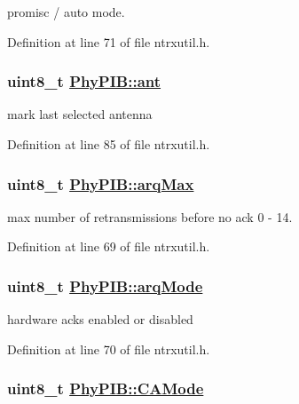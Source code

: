 promisc / auto mode. 

Definition at line 71 of file ntrxutil.h.\hypertarget{structPhyPIB_90a4fd3a47774b102b093feac7c72abc}{
\subsubsection[ant]{\setlength{\rightskip}{0pt plus 5cm}uint8\_\-t \hyperlink{structPhyPIB_90a4fd3a47774b102b093feac7c72abc}{Phy\-PIB::ant}}}
\label{structPhyPIB_90a4fd3a47774b102b093feac7c72abc}


mark last selected antenna 

Definition at line 85 of file ntrxutil.h.\hypertarget{structPhyPIB_3e8ae26144997bb464f1b615ff7b3135}{
\subsubsection[arqMax]{\setlength{\rightskip}{0pt plus 5cm}uint8\_\-t \hyperlink{structPhyPIB_3e8ae26144997bb464f1b615ff7b3135}{Phy\-PIB::arq\-Max}}}
\label{structPhyPIB_3e8ae26144997bb464f1b615ff7b3135}


max number of retransmissions before no ack 0 - 14. 

Definition at line 69 of file ntrxutil.h.\hypertarget{structPhyPIB_a1043ef18681a9185b3d1f64da749ca3}{
\subsubsection[arqMode]{\setlength{\rightskip}{0pt plus 5cm}uint8\_\-t \hyperlink{structPhyPIB_a1043ef18681a9185b3d1f64da749ca3}{Phy\-PIB::arq\-Mode}}}
\label{structPhyPIB_a1043ef18681a9185b3d1f64da749ca3}


hardware acks enabled or disabled 

Definition at line 70 of file ntrxutil.h.\hypertarget{structPhyPIB_d5602e62e32738292b3edbcf40870b81}{
\subsubsection[CAMode]{\setlength{\rightskip}{0pt plus 5cm}uint8\_\-t \hyperlink{structPhyPIB_d5602e62e32738292b3edbcf40870b81}{Phy\-PIB::CAMode}}}
\label{structPhyPIB_d5602e62e32738292b3edbcf40870b81}



